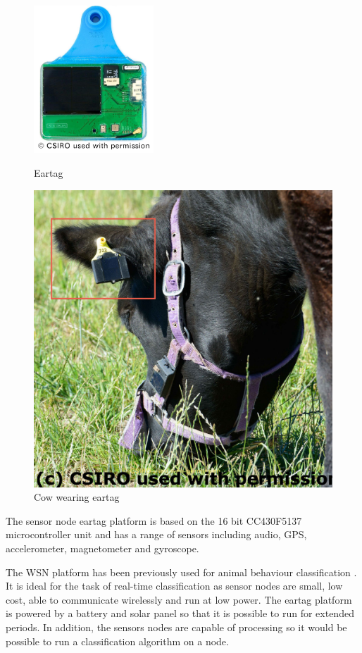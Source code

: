 \begin{figure}[ht!]
\centering
\begin{minipage}{.5\textwidth}
  \centering
  \includegraphics[width=0.4\textwidth]{images/eartag.png}
  \caption{Eartag}
  \label{eartag}
\end{minipage}%
\begin{minipage}{.5\textwidth}
  \centering
  \includegraphics[width=.5\textwidth]{images/cow.jpg}
  \caption{Cow wearing eartag}
  \label{cow}
\end{minipage}
\end{figure}

The sensor node eartag platform is based on the 16 bit CC430F5137 microcontroller unit and has a range of sensors including audio, GPS, accelerometer, magnetometer and gyroscope. 

The WSN platform has been previously used for animal behaviour classification \cite{Guo2006}. It is ideal for the task of real-time classification as sensor nodes are small, low cost, able to communicate wirelessly and run at low power. The eartag platform is powered by a battery and solar panel so that it is possible to run for extended periods. In addition, the sensors nodes are capable of processing so it would be possible to run a classification algorithm on a node. 

